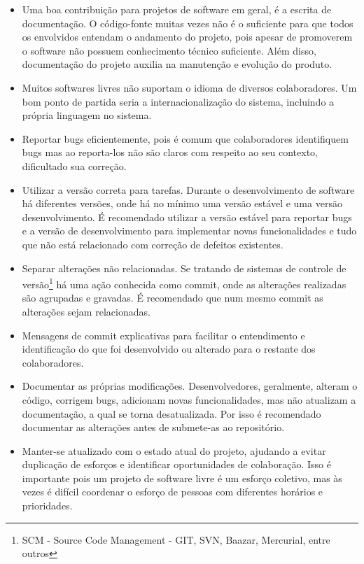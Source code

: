 \begin{itemize}
	\begin{itemize}

		\item Uma boa contribuição para projetos de software em geral, é a escrita de documentação. O código-fonte muitas vezes não é o suficiente para que todos os envolvidos entendam o andamento do projeto, pois apesar de promoverem o software não possuem conhecimento técnico suficiente. Além disso, documentação do projeto auxilia na manutenção e evolução do produto.

		\item Muitos softwares livres não suportam o idioma de diversos colaboradores. Um bom ponto de partida seria a internacionalização do sistema, incluindo a própria linguagem no sistema.

		\item Reportar bugs eficientemente, pois é comum que colaboradores identifiquem bugs mas ao reporta-los não são claros com respeito ao seu contexto, dificultado sua correção.

		\item Utilizar a versão correta para tarefas. Durante o desenvolvimento de software há diferentes versões, onde há no mínimo uma versão estável e uma versão desenvolvimento. É recomendado utilizar a versão estável para reportar bugs e a versão de desenvolvimento para implementar novas funcionalidades e tudo que não está relacionado com correção de defeitos existentes.

		\item Separar alterações não relacionadas. Se tratando de sistemas de controle de versão\footnote{SCM - Source Code Management - GIT, SVN, Baazar, Mercurial, entre outros} há uma ação conhecida como commit, onde as alterações realizadas são agrupadas e gravadas. É recomendado que num mesmo commit as alterações sejam relacionadas.

		\item Mensagens de commit explicativas para facilitar o entendimento e identificação do que foi desenvolvido ou alterado para o restante dos colaboradores.

		\item Documentar as próprias modificações. Desenvolvedores, geralmente, alteram o código, corrigem bugs, adicionam novas funcionalidades, mas não atualizam a documentação, a qual se torna desatualizada. Por isso é recomendado documentar as alterações antes de submete-as ao repositório.

		\item Manter-se atualizado com o estado atual do projeto, ajudando a evitar duplicação de esforços e identificar oportunidades de colaboração. Isso é importante pois um projeto de software livre é um esforço coletivo, mas às vezes é difícil coordenar o esforço de pessoas com diferentes horários e prioridades.

	\end{itemize}

\end{itemize}

